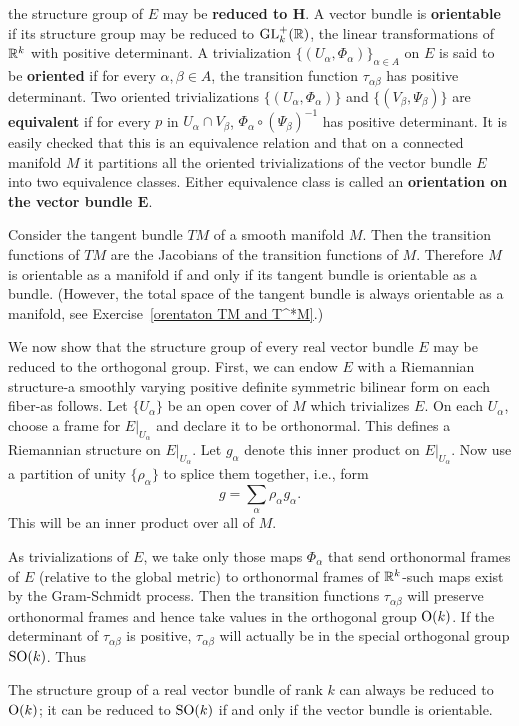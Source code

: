 the structure group of $E$ may be \textbf{reduced to $\bm{H}$}. A vector bundle is \textbf{orientable} if its structure group may be reduced to $\mathrm{GL}_k^+(\mathbb{R})$, the 
linear transformations of $\mathbb{R}^k$ with positive determinant. A trivialization $\{(U_\alpha,\varPhi_\alpha)\}_{\alpha\in A}$ on $E$ is said to be \textbf{oriented} if for 
every $\alpha,\beta\in A$, the transition function $\tau_{\alpha\beta}$ has positive determinant. Two oriented trivializations $\{(U_\alpha,\varPhi_\alpha)\}$ 
and $\{(V_\beta,\varPsi_\beta)\}$ are \textbf{equivalent} if for every $p$ in $U_{\alpha}\cap V_{\beta}$, $\varPhi_{\alpha}\circ(\varPsi_\beta)^{-1}$ has positive 
determinant. It is easily checked that this is an equivalence relation and that on a connected manifold $M$ it partitions all the oriented trivializations of the vector 
bundle $E$ into two equivalence classes. Either equivalence class is called an \textbf{orientation on the vector bundle $\bm{E}$}.
\begin{example}
Consider the tangent bundle $TM$ of a smooth manifold $M$. Then the transition functions of $TM$ are the Jacobians of the transition functions of $M$. Therefore $M$ is 
orientable as a manifold if and only if its tangent bundle is orientable as a bundle. (However, the total space of the tangent bundle is always orientable as a manifold, 
see Exercise~\ref{orentaton TM and T^*M}.)
\end{example}
We now show that the structure group of every real vector bundle $E$ may be reduced to the orthogonal group. First, we can endow $E$ with a Riemannian structure-a 
smoothly varying positive definite symmetric bilinear form on each fiber-as follows. Let $\{U_\alpha\}$ be an open cover of $M$ which trivializes $E$. On each $U_\alpha$, 
choose a frame for $E|_{U_\alpha}$ and declare it to be orthonormal. This defines a Riemannian structure on $E|_{U_\alpha}$. Let $g_{\alpha}$ denote this inner product 
on $E|_{U_\alpha}$. Now use a partition of unity $\{\rho_\alpha\}$ to splice them together, i.e., form
\[g=\sum_\alpha\rho_\alpha g_\alpha.\]
This will be an inner product over all of $M$.\par
As trivializations of $E$, we take only those maps $\varPhi_\alpha$ that send orthonormal frames of $E$ (relative to the global metric) to orthonormal frames of $\mathbb{R}^k$-such 
maps exist by the Gram-Schmidt process. Then the transition functions $\tau_{\alpha\beta}$ will preserve orthonormal frames and hence take values in the orthogonal 
group $\mathrm{O}(k)$. If the determinant of $\tau_{\alpha\beta}$ is positive, $\tau_{\alpha\beta}$ will actually be in the special orthogonal group $\mathrm{SO}(k)$. Thus
\begin{proposition}
The structure group of a real vector bundle of rank $k$ can always be reduced to $\mathrm{O}(k)$; it can be reduced to $\mathrm{SO}(k)$ if and only if the vector bundle is orientable.
\end{proposition}
